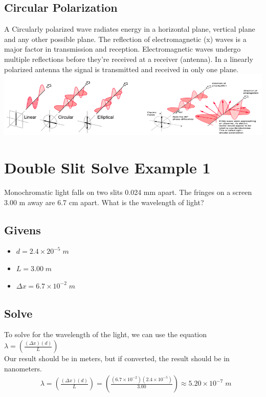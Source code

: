 \documentclass{article}
\begin{document}
\subsection{Circular Polarization}
A Circularly polarized wave radiates energy in a horizontal plane, vertical plane and any other possible plane. The reflection of electromagnetic (x) waves is a major factor in transmission and reception. Electromagnetic waves undergo multiple reflections before they're received at a receiver (antenna). In a linearly polarized antenna the signal is transmitted and received in only one plane.
\includegraphics[scale=0.5]{images/circular_polarization}\\
\vspace{3cm}

\section{Double Slit Solve Example 1}
Monochromatic light falls on two slits 0.024 mm apart. The fringes on a screen 3.00 m away are 6.7 cm apart. What is the wavelength of light?
\subsection*{Givens}
\begin{itemize}
    \item $d = 2.4 \times 20^{-5}\;m$
    \item $L = 3.00\;m $
    \item $\Delta x = 6.7 \times 10^{-2}\;m$
\end{itemize}\leavevmode
\subsection*{Solve}
To solve for the wavelength of the light, we can use the equation $\lambda = \left(\frac{(\Delta x)(d)}{L}\right)$\\ Our result should be in meters, but if converted, the result should be in nanometers.\\
\begin{align*}
     & \lambda = \left(\frac{(\Delta x)(d)}{L}\right)      = \left(\frac{(6.7 \times 10^{-2})(2.4 \times 10^{-5})}{3.00}\right) \approx 5.20 \times 10^{-7}\;m
\end{align*}\leavevmode\\
\end{document}
